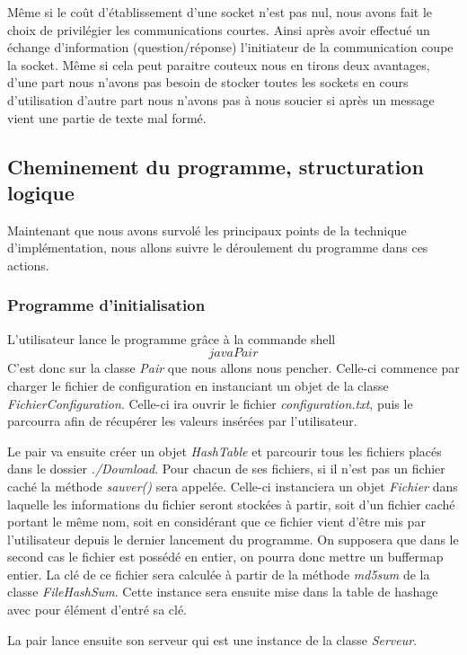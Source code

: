 Même si le coût d'établissement d'une socket n'est pas nul, nous avons
fait le choix de privilégier les communications courtes. Ainsi après
avoir effectué un échange d'information (question/réponse)
l'initiateur de la communication coupe la socket. Même si cela peut
paraitre couteux nous en tirons deux avantages, d'une part nous
n'avons pas besoin de stocker toutes les sockets en cours
d'utilisation d'autre part nous n'avons pas à nous soucier si après un
message vient une partie de texte mal formé.


\subsection{Cheminement du programme, structuration logique}
Maintenant que nous avons survolé les principaux points de la
technique d'implémentation, nous allons suivre le déroulement du
programme dans ces actions.

\subsubsection{Programme d'initialisation}
L'utilisateur lance le programme grâce à la commande shell $$java
Pair$$ C'est donc sur la classe \textit{Pair} que nous allons nous
pencher. Celle-ci commence par charger le fichier de configuration en
instanciant un objet de la classe \textit{FichierConfiguration}. Celle-ci
 ira ouvrir le fichier \textit{configuration.txt}, puis le
parcourra afin de récupérer les valeurs insérées par l'utilisateur.

Le pair va ensuite créer un objet \textit{HashTable} et parcourir
tous les fichiers placés dans le dossier \textit{./Download}. Pour
chacun de ses fichiers, si il n'est pas un fichier caché la méthode
\textit{sauver()} sera appelée. Celle-ci instanciera un objet
\textit{Fichier} dans laquelle les informations du fichier seront
stockées à partir, soit d'un fichier caché portant le même nom, soit en
considérant que ce fichier vient d'être mis par l'utilisateur depuis
le dernier lancement du programme. On supposera que dans le second cas
le fichier est possédé en entier, on pourra donc mettre un buffermap
entier. La clé de ce fichier sera calculée à partir de la méthode
\textit{md5sum} de la classe \textit{FileHashSum}. Cette instance sera
ensuite mise dans la table de hashage avec pour élément d'entré sa
clé.

La pair lance ensuite son serveur qui est une instance de la classe
\textit{Serveur}. 

